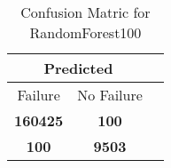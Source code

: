 \begin{table}[] 
\caption{Confusion Matric for RandomForest100} 
\label{Table: Prediction Accuracy-NoneRandomForest10095.0EKF-ignoreReflection-Reflection} 
\centering 
\begin{tabular} 
 {@{}ccc@{}} 
\toprule 
\multicolumn{2}{c}{\textbf{Predicted}}
 \\ \midrule 
\multicolumn{1}{|c|}{Failure} & 
\multicolumn{1}{c|}{No Failure}
 \\ \midrule 
\multicolumn{1}{|c|}{\color{green}\textbf{160425}} & 
\multicolumn{1}{c|}{\color{red}\textbf{100}}
 \\ \midrule 
\multicolumn{1}{|c|}{\color{red}\textbf{100}} & 
\multicolumn{1}{c|}{\color{green}\textbf{9503}}
 \\ \bottomrule 
\end{tabular} 
\end{table} 

